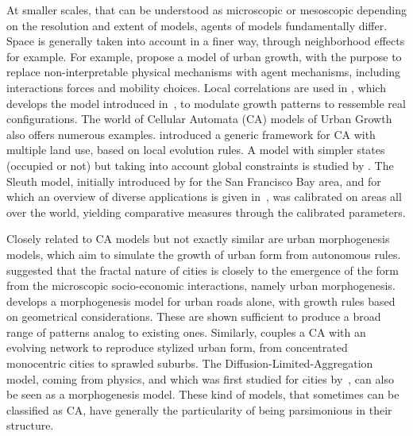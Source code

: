 \documentclass[10pt,letterpaper]{article}
\begin{document}
At smaller scales, that can be understood as microscopic or mesoscopic depending on the resolution and extent of models, agents of models fundamentally differ. Space is generally taken into account in a finer way, through neighborhood effects for example. For example, \cite{andersson2002urban} propose a  model of urban growth, with the purpose to replace non-interpretable physical mechanisms with agent mechanisms, including interactions forces and mobility choices. Local correlations are used in \cite{makse1998modeling}, which develops the model introduced in~\cite{makse1995modelling}, to modulate growth patterns to ressemble real configurations. The world of Cellular Automata (CA) models of Urban Growth~\cite{batty1994cells} also offers numerous examples. \cite{GEAN:GEAN940} introduced a generic framework for CA with multiple land use, based on local evolution rules. A model with simpler states (occupied or not) but taking into account global constraints is studied by  \cite{ward2000stochastically}. The Sleuth model, initially introduced by \cite{clarke1998loose} for the San Francisco Bay area, and for which an overview of diverse applications is given in~\cite{clarke2007decade}, was calibrated on areas all over the world, yielding comparative measures through the calibrated parameters.


Closely related to CA models but not exactly similar are urban morphogenesis models, which aim to simulate the growth of urban form from autonomous rules. \cite{frankhauser1998fractal} suggested that the fractal nature of cities is closely to the emergence of the form from the microscopic socio-economic interactions, namely urban morphogenesis. \cite{courtat2011mathematics} develops a morphogenesis model for urban roads alone, with growth rules based on geometrical considerations. These are shown sufficient to produce a broad range of patterns analog to existing ones. Similarly, \cite{raimbault2014hybrid} couples a CA with an evolving network to reproduce stylized urban form, from concentrated monocentric cities to sprawled suburbs. The Diffusion-Limited-Aggregation model, coming from physics, and which was first studied for cities by~\cite{batty1991generating}, can also be seen as a morphogenesis model.  These kind of models, that sometimes can be classified as CA, have generally the particularity of being parsimonious in their structure. 
\end{document}
